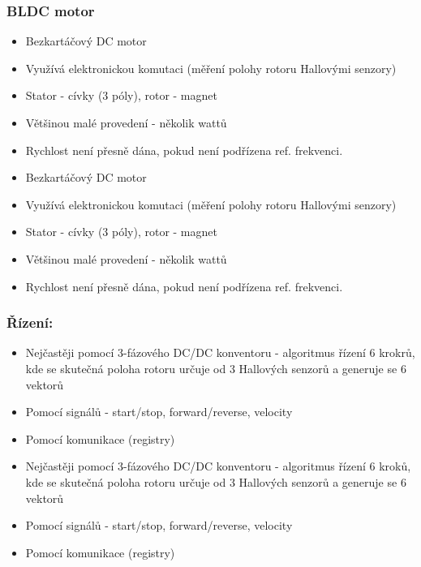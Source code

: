 \subsubsection*{BLDC motor}
\begin{itemize}
  \item Bezkartáčový DC motor
  \item Využívá elektronickou komutaci (měření polohy rotoru Hallovými senzory)
  \item Stator - cívky (3 póly), rotor - magnet
  \item Většinou malé provedení - několik wattů
  \item Rychlost není přesně dána, pokud není podřízena ref. frekvenci.
    \item Bezkartáčový DC motor
    \item Využívá elektronickou komutaci (měření polohy rotoru Hallovými senzory)
    \item Stator - cívky (3 póly), rotor - magnet
    \item Většinou malé provedení - několik wattů
    \item Rychlost není přesně dána, pokud není podřízena ref. frekvenci.
\end{itemize}

\subsubsection*{Řízení:}
\begin{itemize}
  \item Nejčastěji pomocí 3-fázového DC/DC konventoru - algoritmus řízení 6 krokrů, kde se skutečná poloha rotoru určuje od 3 Hallových senzorů a generuje se 6 vektorů
  \item Pomocí signálů - start/stop, forward/reverse, velocity
  \item Pomocí komunikace (registry)
    \item Nejčastěji pomocí 3-fázového DC/DC konventoru - algoritmus řízení 6 kroků, kde se skutečná poloha rotoru určuje od 3 Hallových senzorů a generuje se 6 vektorů
    \item Pomocí signálů - start/stop, forward/reverse, velocity
    \item Pomocí komunikace (registry)
\end{itemize}

